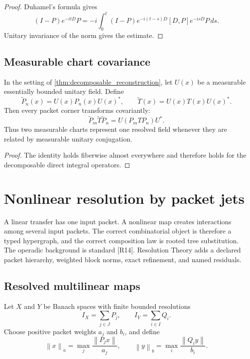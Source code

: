 \documentclass{aomart}
\theoremstyle{definition}
\theoremstyle{remark}
\newcommand{\norm}[1]{\left\lVert#1\right\rVert}
\newcommand{\Rcite}[1]{\textup{[#1]}}
\begin{document}
\begin{proof}
Duhamel's formula gives
\[
 (I-P)e^{-itD}P
 =
 -i\int_0^t
 (I-P)e^{-i(t-s)D}[D,P]e^{-isD}P\,ds.
\]
Unitary invariance of the norm gives the estimate.
\end{proof}

\subsection{Measurable chart covariance}

\begin{proposition}\label{prop:measurable_covariance}
In the setting of \cref{thm:decomposable_reconstruction}, let \(U(x)\) be a measurable essentially bounded unitary field. Define
\[
 \widetilde P_n(x)=U(x)P_n(x)U(x)^*,
 \qquad
 \widetilde T(x)=U(x)T(x)U(x)^*.
\]
Then every packet corner transforms covariantly:
\[
 \boxed{
 \widetilde P_m\widetilde T\widetilde P_n
 =
 U(P_mTP_n)U^*.
 }
\]
Thus two measurable charts represent one resolved field whenever they are related by measurable unitary conjugation.
\end{proposition}

\begin{proof}
The identity holds fiberwise almost everywhere and therefore holds for the decomposable direct integral operators.
\end{proof}

\section{Nonlinear resolution by packet jets}\label{sec:nonlinear}

A linear transfer has one input packet. A nonlinear map creates interactions among several input packets. The correct combinatorial object is therefore a typed hypergraph, and the correct composition law is rooted tree substitution. The operadic background is standard \Rcite{R14}. Resolution Theory adds a declared packet hierarchy, weighted block norms, exact refinement, and named residuals.

\subsection{Resolved multilinear maps}

Let \(X\) and \(Y\) be Banach spaces with finite bounded resolutions
\[
 I_X=\sum_{j\in J}P_j,
 \qquad
 I_Y=\sum_{i\in I}Q_i.
\]
Choose positive packet weights \(a_j\) and \(b_i\), and define
\[
 \norm{x}_a
 =
 \max_j\frac{\norm{P_jx}}{a_j},
 \qquad
 \norm{y}_b
 =
 \max_i\frac{\norm{Q_iy}}{b_i}.
\]
\end{document}
